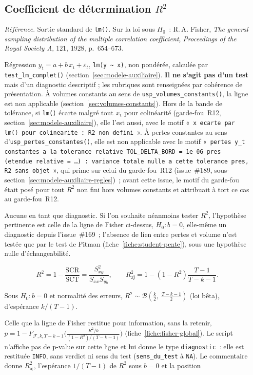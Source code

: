 \documentclass[a4paper,11pt]{article}
\newcommand{\code}[1]{\texttt{\small #1}}
\newcommand{\refl}[1]{{\small\textcolor{maincolor!70!black}{\textit{Référence.} #1}}\par\smallskip}
\newcounter{ficheid}
\newenvironment{fiche}[1]{%
  \stepcounter{ficheid}%
  \phantomsection
  \subsection{#1}%
  \label{fiche:\theficheid}%
}{%
  \end{description}\vspace{0.5em}%
}
\newcommand{\Cadre}{%
  \begin{description}[leftmargin=0pt, style=unboxed, itemsep=3pt, topsep=3pt, parsep=2pt]%
  \item[\textcolor{financeblue}{\textbf{1. Cadre, notations et hypothèses de validité (non testées).}}]}
\newcommand{\Hzero}{\item[\textcolor{financeblue}{\textbf{2. Hypothèse nulle.}}]}
\newcommand{\Stat}{\item[\textcolor{financeblue}{\textbf{3. Statistique de test.}}]}
\newcommand{\Loi}{\item[\textcolor{financeblue}{\textbf{4. Loi sous $H_0$.}}]}
\newcommand{\Pval}{\item[\textcolor{financeblue}{\textbf{5. p-value.}}]}
\begin{document}
\begin{fiche}{Coefficient de détermination $R^2$}
\label{fiche:r2}%
\refl{Sortie standard de \code{lm()}. Sur la loi sous $H_0$~: R.\,A. Fisher, \emph{The general
sampling distribution of the multiple correlation coefficient}, \emph{Proceedings of the Royal
Society A}, 121, 1928, p.~654--673.}
\Cadre
Régression $y_t = a + b\,x_t + \varepsilon_t$, \code{lm(y \textasciitilde\ x)}, non pondérée, calculée par
\code{test\_lm\_complet()} (section~\ref{sec:modele-auxiliaire}). \textbf{Il ne s'agit pas d'un test} mais d'un diagnostic descriptif ;
les rubriques sont renseignées par cohérence de présentation. À volumes constants au sens de \code{usp\_volumes\_constants()}, la ligne est non applicable
(section~\ref{sec:volumes-constants}). Hors de la bande de tolérance, si \code{lm()} écarte malgré tout $x_t$
pour colinéarité (garde-fou~R12, section~\ref{sec:modele-auxiliaire}), elle l'est aussi, avec le
motif «~\code{x ecarte par lm() pour colinearite : R2 non defini}~». À pertes constantes au sens
d'\code{usp\_pertes\_constantes()}, elle est non applicable avec le motif
«~\code{pertes y\_t constantes a la tolerance relative TOL\_DELTA\_BORD = 1e-06 pres (etendue
relative = \dots) : variance totale nulle a cette tolerance pres, R2 sans objet}~», qui prime sur
celui du garde-fou~R12 (issue~\#189, sous-section~\ref{sec:modele-auxiliaire-regles})~; avant
cette issue, le motif du garde-fou était posé pour tout $R^2$ non fini hors volumes constants et
attribuait à tort ce cas au garde-fou~R12.
\Hzero
Aucune en tant que diagnostic. Si l'on souhaite néanmoins tester $R^2$, l'hypothèse pertinente est
celle de la ligne de Fisher ci-dessus, $H_0 : b = 0$, elle-même un diagnostic depuis
l'issue~\#169~; l'absence de lien entre pertes et volume n'est testée que par le test de Pitman
(fiche~\ref{fiche:student-pente}), sous une hypothèse nulle d'échangeabilité.
\Stat
\[
  R^2 = 1 - \frac{\mathrm{SCR}}{\mathrm{SCT}} = \frac{S_{xy}^2}{S_{xx}S_{yy}},
  \qquad
  R^2_{\text{aj}} = 1 - (1-R^2)\frac{T-1}{T-k-1}.
\]
\Loi
Sous $H_0 : b = 0$ et normalité des erreurs,
$R^2 \sim \mathcal{B}\!\left(\tfrac{k}{2},\ \tfrac{T-k-1}{2}\right)$ (loi bêta), d'espérance
$k/(T-1)$.
\Pval
Celle que la ligne de Fisher restitue pour information, sans la retenir,
$p = 1 - F_{\mathcal{F},k,T-k-1}\!\big(\tfrac{R^2/k}{(1-R^2)/(T-k-1)}\big)$
(fiche~\ref{fiche:fisher-global}).
Le script n'affiche pas de p-value sur cette ligne et lui donne le type \code{diagnostic}~: elle
est restituée \code{INFO}, sans verdict ni sens du test (\code{sens\_du\_test} à \code{NA}). Le
commentaire donne $R^2_{\text{aj}}$, l'espérance $1/(T-1)$ de $R^2$ sous $b = 0$ et la position

\end{fiche}
\end{document}
